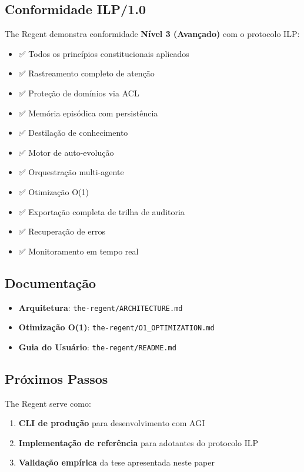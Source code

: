 \documentclass[11pt]{article}
\begin{document}
\subsection{Conformidade ILP/1.0}

The Regent demonstra conformidade \textbf{Nível 3 (Avançado)} com o protocolo ILP:

\begin{itemize}
    \item ✅ Todos os princípios constitucionais aplicados
    \item ✅ Rastreamento completo de atenção
    \item ✅ Proteção de domínios via ACL
    \item ✅ Memória episódica com persistência
    \item ✅ Destilação de conhecimento
    \item ✅ Motor de auto-evolução
    \item ✅ Orquestração multi-agente
    \item ✅ Otimização O(1)
    \item ✅ Exportação completa de trilha de auditoria
    \item ✅ Recuperação de erros
    \item ✅ Monitoramento em tempo real
\end{itemize}

\subsection{Documentação}

\begin{itemize}
    \item \textbf{Arquitetura}: \texttt{the-regent/ARCHITECTURE.md}
    \item \textbf{Otimização O(1)}: \texttt{the-regent/O1\_OPTIMIZATION.md}
    \item \textbf{Guia do Usuário}: \texttt{the-regent/README.md}
\end{itemize}

\subsection{Próximos Passos}

The Regent serve como:
\begin{enumerate}
    \item \textbf{CLI de produção} para desenvolvimento com AGI
    \item \textbf{Implementação de referência} para adotantes do protocolo ILP
    \item \textbf{Validação empírica} da tese apresentada neste paper
\end{enumerate}
\end{document}
